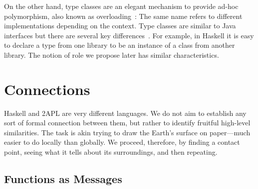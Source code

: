 \documentclass[conference,compsoc]{IEEEtran} %
\begin{document}
On the other hand, type classes are an elegant mechanism to provide ad-hoc
polymorphism, also known as overloading~\cite{DBLP:conf/popl/WadlerB89}:
The same name refers to different implementations depending on the context.
Type classes are similar to Java interfaces but there are several key
differences~\cite{WEB:PJ-tc}. For example, in Haskell it is easy to declare
a type from one library to be an instance of a class from another library.
The notion of role we propose later has similar characteristics.

\section{Connections} %

Haskell and 2APL are very different languages. We do not aim to establish
any sort of formal connection between them, but rather to identify fruitful
high-level similarities. The task is akin trying to draw the Earth's
surface on paper---much easier to do locally than globally. We proceed,
therefore, by finding a contact point, seeing what it tells about its
surroundings, and then repeating.

\subsection{Functions as Messages} %
\end{document}
